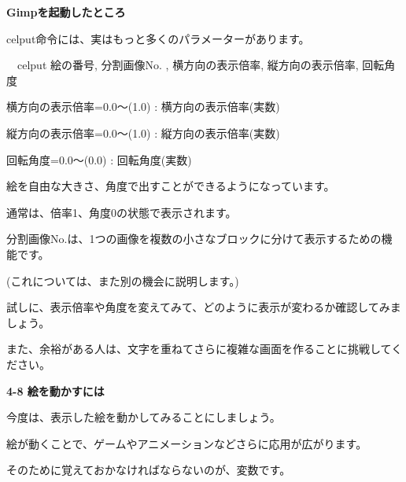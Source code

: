 \documentclass[a4paper,dvipdfmx]{jarticle}
\newcommand\textstyleqwerty[1]{#1}
\begin{document}
\bigskip


\bigskip


\bigskip


\bigskip


\bigskip


\bigskip


\bigskip


\bigskip

\textstyleqwerty{\textbf{Gimpを起動したところ}}


\bigskip


\bigskip


\bigskip


\bigskip


\bigskip

celput命令には、実はもっと多くのパラメーターがあります。


\bigskip

\ \ celput 絵の番号, 分割画像No. ,
横方向の表示倍率, 縦方向の表示倍率,
回転角度


\bigskip

横方向の表示倍率=0.0〜(1.0) :
横方向の表示倍率(実数)

縦方向の表示倍率=0.0〜(1.0) :
縦方向の表示倍率(実数)

回転角度=0.0〜(0.0) : 回転角度(実数)


\bigskip

絵を自由な大きさ、角度で出すことができるようになっています。

通常は、倍率1、角度0の状態で表示されます。

分割画像No.は、1つの画像を複数の小さなブロックに分けて表示するための機能です。

(これについては、また別の機会に説明します。)


\bigskip

試しに、表示倍率や角度を変えてみて、どのように表示が変わるか確認してみましょう。

また、余裕がある人は、文字を重ねてさらに複雑な画面を作ることに挑戦してください。


\bigskip


\bigskip

{\bfseries
4-8 絵を動かすには}


\bigskip

今度は、表示した絵を動かしてみることにしましょう。

絵が動くことで、ゲームやアニメーションなどさらに応用が広がります。

そのために覚えておかなければならないのが、変数です。


\bigskip
\end{document}
